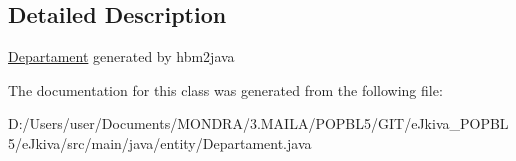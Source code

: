 \subsection{Detailed Description}
\mbox{\hyperlink{classentity_1_1_departament}{Departament}} generated by hbm2java 

The documentation for this class was generated from the following file\+:\begin{DoxyCompactItemize}
\item 
D\+:/\+Users/user/\+Documents/\+M\+O\+N\+D\+R\+A/3.\+M\+A\+I\+L\+A/\+P\+O\+P\+B\+L5/\+G\+I\+T/e\+Jkiva\+\_\+\+P\+O\+P\+B\+L5/e\+Jkiva/src/main/java/entity/Departament.\+java\end{DoxyCompactItemize}
